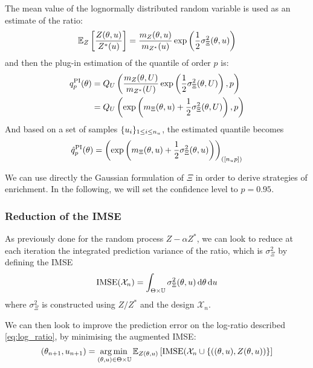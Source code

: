 \documentclass[../../Main_ManuscritThese.tex]{subfiles}
\begin{document}
The mean value of the lognormally distributed random variable is used
as an estimate of the ratio:
\begin{equation}
  \label{eq:mean_ratio_logn}
\mathbb{E}_Z\left[\frac{Z(\theta, u)}{Z^*(u)}\right] = \frac{m_Z(\theta, u)}{m_{Z^*}(u)}\exp\left(\frac{1}{2}\sigma^2_{\Xi}(\theta, u)\right) 
\end{equation}
and then the plug-in estimation of the quantile of
order $p$ is:
\begin{align}
  {q}^{\mathrm{PI}}_p(\theta) &= Q_{U}\left(\frac{m_Z(\theta, U)}{m_{Z^*}(U)}\exp\left(\frac{1}{2}\sigma^2_{\Xi}(\theta, U)\right),p \right)\\ &= Q_{U}\left(\exp\left(m_{\Xi}(\theta, u)+\frac{1}{2}\sigma^2_{\Xi}(\theta, U)\right),p \right)
\end{align}
And based on a set of samples $\{u_i\}_{1\leq i \leq n_{u}}$, the estimated quantile becomes
\begin{equation}
  \hat{q}^{\mathrm{PI}}_p(\theta) = {\left(\exp\left(m_{\Xi}(\theta, u)+\frac{1}{2}\sigma^2_{\Xi}(\theta, u)\right)\right)}_{\left(\left[n_{u}p\right]\right)}
\end{equation}


We can use directly the Gaussian formulation of $\Xi$ in order to
derive strategies of enrichment. In the following, we will set the
confidence level to $p=0.95$.
  
  \subsubsection{Reduction of the IMSE}
  \label{ssec:reduction_imse_quantile}
  As previously done for the random process $Z - \alpha Z^*$, we can
  look to reduce at each iteration the integrated prediction variance
  of the ratio, which is $\sigma^2_{\Xi}$ by defining the IMSE
\begin{equation}
  \operatorname{\mathrm{IMSE}}(\mathcal{X}_n) = \int_{\Theta\times\mathbb{U}} \sigma_{\Xi}^2(\theta, u) \,\mathrm{d}\theta\,\mathrm{d}u
\end{equation}
where $\sigma_\Xi^2$ is constructed using $Z/Z^*$ and the design $\mathcal{X}_n$.

We can then look to improve the prediction error on the log-ratio
described \cref{eq:log_ratio}, by minimising the augmented IMSE:
\begin{equation}
  \label{eq:aIMSE_Xi}
 (\theta_{n+1}, u_{n+1}) = \operatorname*{arg\,min \,}_{(\theta, u) \in \Theta \times \mathbb{U}}\mathbb{E}_{Z(\theta,u)}\left[\operatorname{\mathrm{IMSE}}(\mathcal{X}_n \cup \left\{\left((\theta, u),Z(\theta, u)\right)\right\}\right]
\end{equation}
\end{document}
